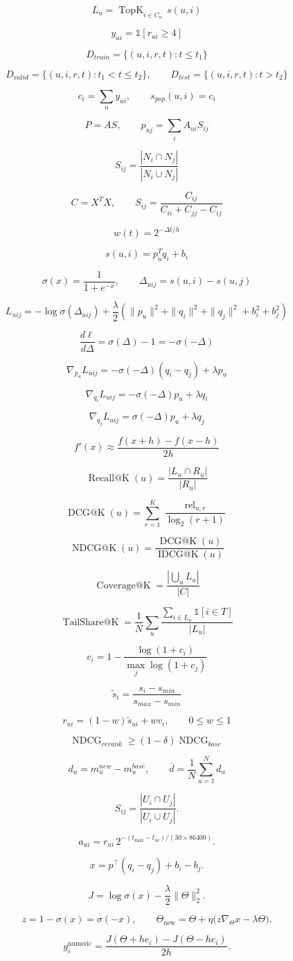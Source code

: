 \[
L_u=\operatorname{TopK}_{i\in C_u}\,s(u,i)
\]

\[
y_{ui}=\mathbb{1}[r_{ui}\geq 4]
\]

\[
D_{train}=\{(u,i,r,t):t\leq t_1\}
\]

\[
D_{valid}=\{(u,i,r,t):t_1<t\leq t_2\},\qquad D_{test}=\{(u,i,r,t):t>t_2\}
\]

\[
c_i=\sum_u y_{ui},\qquad s_{pop}(u,i)=c_i
\]

\[
P=A S,\qquad p_{uj}=\sum_i A_{ui}S_{ij}
\]

\[
S_{ij}=\frac{|N_i\cap N_j|}{|N_i\cup N_j|}
\]

\[
C=X^T X,\qquad S_{ij}=\frac{C_{ij}}{C_{ii}+C_{jj}-C_{ij}}
\]

\[
w(t)=2^{-\Delta t/h}
\]

\[
s(u,i)=p_u^T q_i+b_i
\]

\[
\sigma(x)=\frac{1}{1+e^{-x}},\qquad \Delta_{uij}=s(u,i)-s(u,j)
\]

\[
L_{uij}=-\log\sigma(\Delta_{uij})+\frac{\lambda}{2}(\|p_u\|^2+\|q_i\|^2+\|q_j\|^2+b_i^2+b_j^2)
\]

\[
\frac{d\ell}{d\Delta}=\sigma(\Delta)-1=-\sigma(-\Delta)
\]

\[
\nabla_{p_u}L_{uij}=-\sigma(-\Delta)(q_i-q_j)+\lambda p_u
\]

\[
\nabla_{q_i}L_{uij}=-\sigma(-\Delta)p_u+\lambda q_i
\]

\[
\nabla_{q_j}L_{uij}=\sigma(-\Delta)p_u+\lambda q_j
\]

\[
f'(x)\approx\frac{f(x+h)-f(x-h)}{2h}
\]

\[
\operatorname{Recall@K}(u)=\frac{|L_u\cap R_u|}{|R_u|}
\]

\[
\operatorname{DCG@K}(u)=\sum_{r=1}^{K}\frac{\operatorname{rel}_{u,r}}{\log_2(r+1)}
\]

\[
\operatorname{NDCG@K}(u)=\frac{\operatorname{DCG@K}(u)}{\operatorname{IDCG@K}(u)}
\]

\[
\operatorname{Coverage@K}=\frac{|\bigcup_u L_u|}{|C|}
\]

\[
\operatorname{TailShare@K}=\frac{1}{N}\sum_u\frac{\sum_{i\in L_u}\mathbb{1}[i\in T]}{|L_u|}
\]

\[
v_i=1-\frac{\log(1+c_i)}{\max_j\log(1+c_j)}
\]

\[
\widetilde{s}_i=\frac{s_i-s_{min}}{s_{max}-s_{min}}
\]

\[
r_{ui}=(1-w)\widetilde{s}_{ui}+wv_i,\qquad 0\leq w\leq 1
\]

\[
\operatorname{NDCG}_{rerank}\geq(1-\delta)\operatorname{NDCG}_{base}
\]

\[
d_u=m_u^{new}-m_u^{base},\qquad \overline{d}=\frac{1}{N}\sum_{u=1}^{N}d_u
\]

\[
S_{ij}=\frac{|U_i\cap U_j|}{|U_i\cup U_j|}.
\]

\[
a_{ui}=r_{ui}\,2^{-(t_{\max}-t_{ui})/(30\times86400)}.
\]

\[
x=p^\top(q_i-q_j)+b_i-b_j.
\]

\[
J=\log\sigma(x)-\frac{\lambda}{2}\|\Theta\|_2^2.
\]

\[
z=1-\sigma(x)=\sigma(-x),\qquad \Theta_{\mathrm{new}}=\Theta+\eta\bigl(z\nabla_\Theta x-\lambda\Theta\bigr).
\]

\[
g_i^{\mathrm{numeric}} =\frac{J(\Theta+h e_i)-J(\Theta-h e_i)}{2h}.
\]